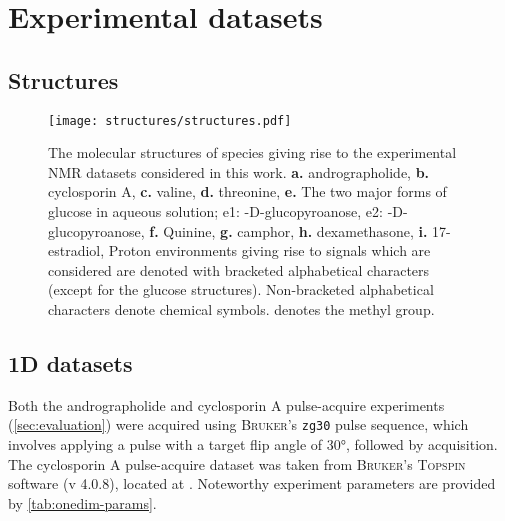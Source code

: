 

\section{Experimental datasets}

\subsection{Structures}

\begin{figure}[H]
    \centering
    \texttt{[image: structures/structures.pdf]}
    \caption[
        The molecular structures of species giving rise to the experimental
        \acs{NMR} datasets considered in this work.
    ]{
        The molecular structures of species giving rise to the experimental
        \acs{NMR} datasets considered in this work.
        \textbf{a.} andrographolide,
        \textbf{b.} cyclosporin A,
        \textbf{c.} valine,
        \textbf{d.} threonine,
        \textbf{e.} The two major forms of glucose in aqueous solution;
            e1: \textalpha-D-glucopyroanose,
            e2: \textbeta-D-glucopyroanose,
        \textbf{f.} Quinine,
        \textbf{g.} camphor,
        \textbf{h.} dexamethasone,
        \textbf{i.} 17\textbeta-estradiol,
        Proton environments giving rise to signals which are considered are
        denoted with bracketed alphabetical characters (except for the glucose
        structures). Non-bracketed alphabetical characters denote chemical
        symbols.  denotes the methyl group.
    }
    \label{fig:structures}
\end{figure}

\subsection{\acs{1D} datasets}

Both the andrographolide and cyclosporin A pulse-acquire experiments
(\cref{sec:evaluation}) were acquired using \textsc{Bruker}'s \texttt{zg30}
pulse sequence, which involves applying a pulse with a target flip angle of
\ang{30}, followed by acquisition.  The cyclosporin A pulse-acquire dataset was
taken from \textsc{Bruker}'s \textsc{Topspin} software (v 4.0.8), located at
.  Noteworthy experiment
parameters are provided by \cref{tab:onedim-params}.


